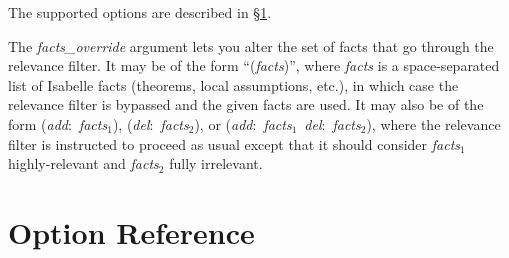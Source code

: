 \documentclass[a4paper,12pt]{article}
\begin{document}
The supported options are described in \S\ref{option-reference}.

The \textit{facts\_override} argument lets you alter the set of facts that go
through the relevance filter. It may be of the form ``(\textit{facts})'', where
\textit{facts} is a space-separated list of Isabelle facts (theorems, local
assumptions, etc.), in which case the relevance filter is bypassed and the given
facts are used. It may also be of the form (\textit{add}:\ \textit{facts}$_1$),
(\textit{del}:\ \textit{facts}$_2$), or (\textit{add}:\ \textit{facts}$_1$\
\textit{del}:\ \textit{facts}$_2$), where the relevance filter is instructed to
proceed as usual except that it should consider \textit{facts}$_1$
highly-relevant and \textit{facts}$_2$ fully irrelevant.

\section{Option Reference}
\label{option-reference}

\def\flushitem#1{\item[]\noindent\kern-\leftmargin \textbf{#1}}
\def\qty#1{$\left<\textit{#1}\right>$}
\def\qtybf#1{$\mathbf{\left<\textbf{\textit{#1}}\right>}$}
\def\optrue#1#2{\flushitem{\textit{#1} $\bigl[$= \qtybf{bool}$\bigr]$\quad [\textit{true}]\hfill (neg.: \textit{#2})}\nopagebreak\\[\parskip]}
\def\opfalse#1#2{\flushitem{\textit{#1} $\bigl[$= \qtybf{bool}$\bigr]$\quad [\textit{false}]\hfill (neg.: \textit{#2})}\nopagebreak\\[\parskip]}
\def\opsmart#1#2{\flushitem{\textit{#1} $\bigl[$= \qtybf{bool\_or\_smart}$\bigr]$\quad [\textit{smart}]\hfill (neg.: \textit{#2})}\nopagebreak\\[\parskip]}
\def\opsmartx#1#2{\flushitem{\textit{#1} $\bigl[$= \qtybf{bool\_or\_smart}$\bigr]$\quad [\textit{smart}]\hfill\\\hbox{}\hfill (neg.: \textit{#2})}\nopagebreak\\[\parskip]}
\def\opnodefault#1#2{\flushitem{\textit{#1} = \qtybf{#2}} \nopagebreak\\[\parskip]}
\def\opdefault#1#2#3{\flushitem{\textit{#1} = \qtybf{#2}\quad [\textit{#3}]} \nopagebreak\\[\parskip]}
\def\oparg#1#2#3{\flushitem{\textit{#1} \qtybf{#2} = \qtybf{#3}} \nopagebreak\\[\parskip]}
\def\opargbool#1#2#3{\flushitem{\textit{#1} \qtybf{#2} $\bigl[$= \qtybf{bool}$\bigr]$\hfill (neg.: \textit{#3})}\nopagebreak\\[\parskip]}
\def\opargboolorsmart#1#2#3{\flushitem{\textit{#1} \qtybf{#2} $\bigl[$= \qtybf{bool\_or\_smart}$\bigr]$\hfill (neg.: \textit{#3})}\nopagebreak\\[\parskip]}
\end{document}
